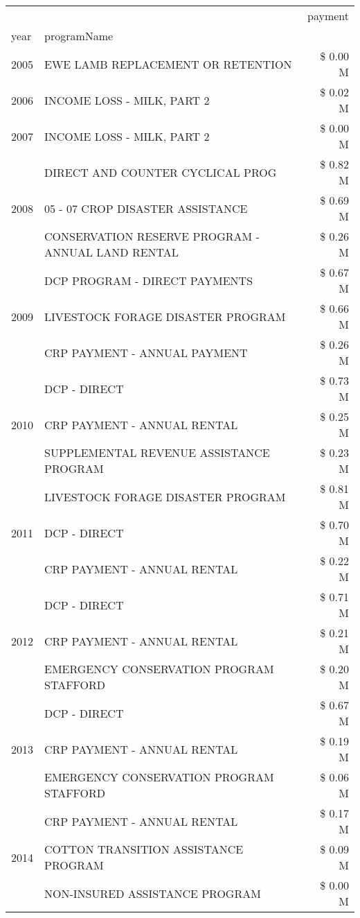 \begin{tabular}{llr}
\toprule
 &  & payment \\
year & programName &  \\
\midrule
2005 & EWE LAMB REPLACEMENT OR RETENTION & \$ 0.00 M \\
\cline{1-3}
2006 & INCOME LOSS - MILK, PART 2 & \$ 0.02 M \\
\cline{1-3}
2007 & INCOME LOSS - MILK, PART 2 & \$ 0.00 M \\
\cline{1-3}
\multirow[t]{3}{*}{2008} & DIRECT AND COUNTER CYCLICAL PROG & \$ 0.82 M \\
 & 05 - 07 CROP DISASTER ASSISTANCE & \$ 0.69 M \\
 & CONSERVATION RESERVE PROGRAM - ANNUAL LAND RENTAL & \$ 0.26 M \\
\cline{1-3}
\multirow[t]{3}{*}{2009} & DCP PROGRAM - DIRECT PAYMENTS & \$ 0.67 M \\
 & LIVESTOCK FORAGE DISASTER  PROGRAM & \$ 0.66 M \\
 & CRP PAYMENT - ANNUAL PAYMENT & \$ 0.26 M \\
\cline{1-3}
\multirow[t]{3}{*}{2010} & DCP - DIRECT & \$ 0.73 M \\
 & CRP PAYMENT - ANNUAL RENTAL & \$ 0.25 M \\
 & SUPPLEMENTAL REVENUE ASSISTANCE PROGRAM & \$ 0.23 M \\
\cline{1-3}
\multirow[t]{3}{*}{2011} & LIVESTOCK FORAGE DISASTER PROGRAM & \$ 0.81 M \\
 & DCP - DIRECT & \$ 0.70 M \\
 & CRP PAYMENT - ANNUAL RENTAL & \$ 0.22 M \\
\cline{1-3}
\multirow[t]{3}{*}{2012} & DCP - DIRECT & \$ 0.71 M \\
 & CRP PAYMENT - ANNUAL RENTAL & \$ 0.21 M \\
 & EMERGENCY CONSERVATION PROGRAM STAFFORD & \$ 0.20 M \\
\cline{1-3}
\multirow[t]{3}{*}{2013} & DCP - DIRECT & \$ 0.67 M \\
 & CRP PAYMENT - ANNUAL RENTAL & \$ 0.19 M \\
 & EMERGENCY CONSERVATION PROGRAM STAFFORD & \$ 0.06 M \\
\cline{1-3}
\multirow[t]{3}{*}{2014} & CRP PAYMENT - ANNUAL RENTAL & \$ 0.17 M \\
 & COTTON TRANSITION ASSISTANCE PROGRAM & \$ 0.09 M \\
 & NON-INSURED ASSISTANCE PROGRAM & \$ 0.00 M \\
\cline{1-3}

\end{tabular}
